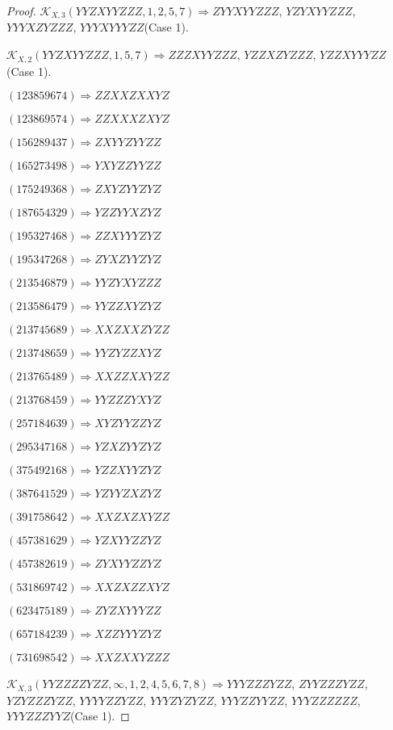 \documentclass[12pt]{article}
\theoremstyle{plain}
\theoremstyle{definition}
\theoremstyle{remark}
\newcommand{\fancy}[1]{\mathcal{#1}}
\def\K{\fancy{K}}
\begin{document}
\begin{proof}
	$\K_{X,3}(YYZXYYZZZ,1, 2, 5, 7)\Rightarrow $$ZYYXYYZZZ$, $YZYXYYZZZ$, $YYYXZYZZZ$, $YYYXYYYZZ$(Case 1).
	
	$\K_{X,2}(YYZXYYZZZ,1, 5, 7)\Rightarrow $$ZZZXYYZZZ$, $YZZXZYZZZ$, $YZZXYYYZZ$(Case 1).
	
	
	
	$(1 2 3 8 5 9 6 7 4)\Rightarrow ZZXXZXXYZ$
	
	$(1 2 3 8 6 9 5 7 4)\Rightarrow ZZXXXZXYZ$
	
	$(1 5 6 2 8 9 4 3 7)\Rightarrow ZXYYZYYZZ$
	
	$(1 6 5 2 7 3 4 9 8)\Rightarrow YXYZZYYZZ$
	
	$(1 7 5 2 4 9 3 6 8)\Rightarrow ZXYZYYZYZ$
	
	$(1 8 7 6 5 4 3 2 9)\Rightarrow YZZYYXZYZ$
	
	$(1 9 5 3 2 7 4 6 8)\Rightarrow ZZXYYYZYZ$
	
	$(1 9 5 3 4 7 2 6 8)\Rightarrow ZYXZYYZYZ$
	
	$(2 1 3 5 4 6 8 7 9)\Rightarrow YYZYXYZZZ$
	
	$(2 1 3 5 8 6 4 7 9)\Rightarrow YYZZXYZYZ$
	
	$(2 1 3 7 4 5 6 8 9)\Rightarrow XXZXXZYZZ$
	
	$(2 1 3 7 4 8 6 5 9)\Rightarrow YYZYZZXYZ$
	
	$(2 1 3 7 6 5 4 8 9)\Rightarrow XXZZXXYZZ$
	
	$(2 1 3 7 6 8 4 5 9)\Rightarrow YYZZZYXYZ$
	
	$(2 5 7 1 8 4 6 3 9)\Rightarrow XYZYYZZYZ$
	
	$(2 9 5 3 4 7 1 6 8)\Rightarrow YZXZYYZYZ$
	
	$(3 7 5 4 9 2 1 6 8)\Rightarrow YZZXYYZYZ$
	
	$(3 8 7 6 4 1 5 2 9)\Rightarrow YZYYZXZYZ$
	
	$(3 9 1 7 5 8 6 4 2)\Rightarrow XXZXZXYZZ$
	
	$(4 5 7 3 8 1 6 2 9)\Rightarrow YZXYYZZYZ$
	
	$(4 5 7 3 8 2 6 1 9)\Rightarrow ZYXYYZZYZ$
	
	$(5 3 1 8 6 9 7 4 2)\Rightarrow XXZXZZXYZ$
	
	$(6 2 3 4 7 5 1 8 9)\Rightarrow ZYZXYYYZZ$
	
	$(6 5 7 1 8 4 2 3 9)\Rightarrow XZZYYYZYZ$
	
	$(7 3 1 6 9 8 5 4 2)\Rightarrow XXZXXYZZZ$
	
	
	
	$\K_{X,3}(YYZZZZYZZ,\infty,1, 2, 4, 5, 6, 7, 8)\Rightarrow $$YYYZZZYZZ$, $ZYYZZZYZZ$, $YZYZZZYZZ$, $YYYYZZYZZ$, $YYYZYZYZZ$, $YYYZZYYZZ$, $YYYZZZZZZ$, $YYYZZZYYZ$(Case 1).
	

\end{proof}
\end{document}
